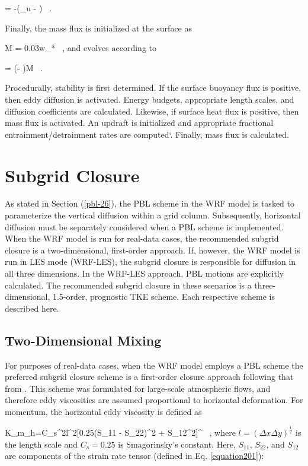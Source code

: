 \be
{} = -\gamma (\phi_u - \phi) \mbox{ .} \label{equation365}
\ee


Finally, the mass flux is initialized at the surface as

\be
M = 0.03w_* \mbox{ ,} \label{equation366}
\ee
\noindent
 and evolves according to

\be
{} = (\gamma - \delta)M \mbox{ .} \label{equation367}
\ee


Procedurally, stability is first determined. If the surface buoyancy flux is positive, then eddy diffusion is activated. Energy budgets, appropriate length scales, and diffusion coefficients are calculated. Likewise, if surface heat flux is positive, then mass flux is activated. An updraft is initialized and appropriate fractional entrainment\slash detrainment rates are computed`. Finally, mass flux is calculated.

\section{Subgrid Closure}
\label{sg-close-37}

As stated in Section (\autoref{pbl-26}), the PBL scheme in the WRF model is tasked to parameterize the vertical diffusion within a grid column. Subsequently, horizontal diffusion must be separately considered when a PBL scheme is implemented. When the WRF model is run for real-data cases, the recommended subgrid closure is a two-dimensional, first-order approach. If, however, the WRF model is run in LES mode (WRF-LES), the subgrid closure is responsible for diffusion in all three dimensions. In the WRF-LES approach, PBL motions are explicitly calculated. The recommended subgrid closure in these scenarios is a three-dimensional, 1.5-order, prognostic TKE scheme. Each respective scheme is described here.

\subsection{Two-Dimensional Mixing}
\label{twod-mix-371}

For purposes of real-data cases, when the WRF model employs a PBL scheme the preferred subgrid closure scheme is a first-order closure approach following that from  \citet{Smag}. This scheme was formulated for large-scale atmospheric flows, and therefore eddy viscosities are assumed proportional to horizontal deformation. For momentum, the horizontal eddy viscosity is defined as

\be
K_{m_{h}}=C_s^2l^2[0.25(S_{11} - S_{22})^2 + S_{12}^2]^{} \mbox{ ,} \label{equation368}
\ee
\noindent
 where $l=(\Delta x \Delta y)^{\frac{1}{2}}$ is the length scale and $C_s = 0.25$ is Smagorinsky's constant. Here, $S_{11}$, $S_{22}$, and $S_{12}$ are components of the strain rate tensor (defined in Eq. \autoref{equation201}):

